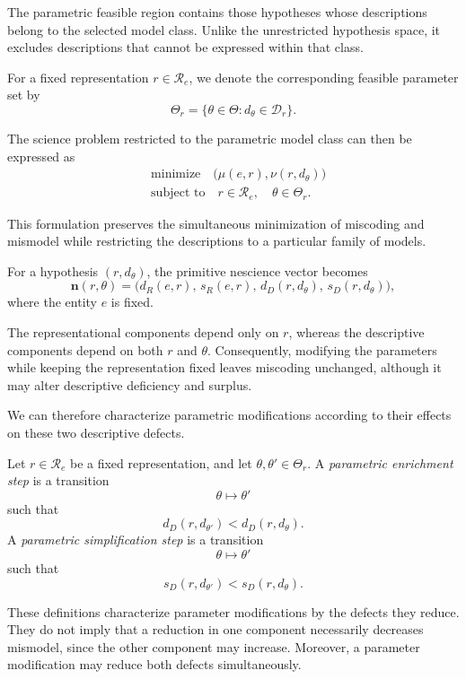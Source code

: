 The parametric feasible region contains those hypotheses whose descriptions belong to the selected model class. Unlike the unrestricted hypothesis space, it excludes descriptions that cannot be expressed within that class.

For a fixed representation $r\in\mathcal R_e$, we denote the corresponding feasible parameter set by
\[
\Theta_r = \{\theta\in\Theta:d_\theta\in\mathcal D_r\}.
\]

The science problem restricted to the parametric model class can then be expressed as
\begin{align*}
&\text{minimize}\quad \bigl(\mu(e,r),\nu(r,d_\theta)\bigr)\\
&\text{subject to}\quad r\in\mathcal R_e,\quad\theta\in\Theta_r.
\end{align*}

This formulation preserves the simultaneous minimization of miscoding and mismodel while restricting the descriptions to a particular family of models.

For a hypothesis $(r,d_\theta)$, the primitive nescience vector becomes
\[
\mathbf n(r,\theta) = \bigl(d_R(e,r),\, s_R(e,r),\, d_D(r,d_\theta),\, s_D(r,d_\theta) \bigr),
\]
where the entity $e$ is fixed.

The representational components depend only on $r$, whereas the descriptive components depend on both $r$ and $\theta$. Consequently, modifying the parameters while keeping the representation fixed leaves miscoding unchanged, although it may alter descriptive deficiency and surplus.

We can therefore characterize parametric modifications according to their effects on these two descriptive defects.

\begin{definition}
Let $r\in\mathcal R_e$ be a fixed representation, and let $\theta,\theta'\in\Theta_r$. A \emph{parametric enrichment step}  is a transition
\[
\theta\mapsto\theta'
\]
such that
\[
d_D(r,d_{\theta'}) < d_D(r,d_\theta).
\]
A \emph{parametric simplification step}  is a transition
\[
\theta\mapsto\theta'
\]
such that
\[
s_D(r,d_{\theta'}) < s_D(r,d_\theta).
\]
\end{definition}

These definitions characterize parameter modifications by the defects they reduce. They do not imply that a reduction in one component necessarily decreases mismodel, since the other component may increase. Moreover, a parameter modification may reduce both defects simultaneously.

